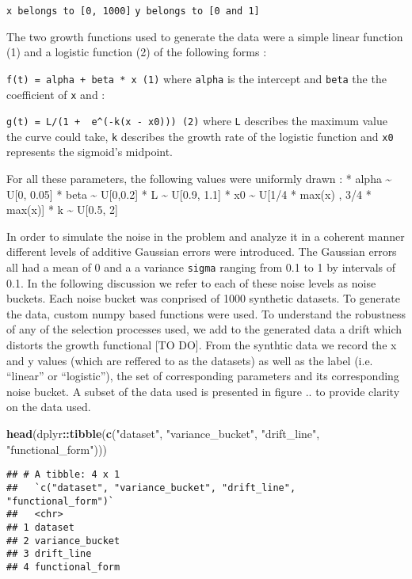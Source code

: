 \documentclass[]{article}
\newenvironment{Shaded}{\begin{snugshade}}{\end{snugshade}}
\newcommand{\KeywordTok}[1]{\textcolor[rgb]{0.13,0.29,0.53}{\textbf{#1}}}
\newcommand{\NormalTok}[1]{#1}
\newcommand{\OperatorTok}[1]{\textcolor[rgb]{0.81,0.36,0.00}{\textbf{#1}}}
\newcommand{\StringTok}[1]{\textcolor[rgb]{0.31,0.60,0.02}{#1}}
\begin{document}
\texttt{x\ belongs\ to\ {[}0,\ 1000{]}}
\texttt{y\ belongs\ to\ {[}0\ and\ 1{]}}

The two growth functions used to generate the data were a simple linear
function (1) and a logistic function (2) of the following forms :

\texttt{f(t)\ =\ alpha\ +\ beta\ *\ x\ (1)} where \texttt{alpha} is the
intercept and \texttt{beta} the the coefficient of \texttt{x} and :

\texttt{g(t)\ =\ L/(1\ +\ \ e\^{}(-k(x\ -\ x0)))\ (2)} where \texttt{L}
describes the maximum value the curve could take, \texttt{k} describes
the growth rate of the logistic function and \texttt{x0} represents the
sigmoid's midpoint.

For all these parameters, the following values were uniformly drawn : *
alpha \textasciitilde{} U{[}0, 0.05{]} * beta \textasciitilde{}
U{[}0,0.2{]} * L \textasciitilde{} U{[}0.9, 1.1{]} * x0
\textasciitilde{} U{[}1/4 * max(x) , 3/4 * max(x){]} * k
\textasciitilde{} U{[}0.5, 2{]}

In order to simulate the noise in the problem and analyze it in a
coherent manner different levels of additive Gaussian errors were
introduced. The Gaussian errors all had a mean of 0 and a a variance
\texttt{sigma} ranging from 0.1 to 1 by intervals of 0.1. In the
following discussion we refer to each of these noise levels as noise
buckets. Each noise bucket was conprised of 1000 synthetic datasets. To
generate the data, custom numpy based functions were used. To understand
the robustness of any of the selection processes used, we add to the
generated data a drift which distorts the growth functional {[}TO DO{]}.
From the synthtic data we record the x and y values (which are reffered
to as the datasets) as well as the label (i.e. ``linear'' or
``logistic''), the set of corresponding parameters and its corresponding
noise bucket. A subset of the data used is presented in figure .. to
provide clarity on the data used.

\begin{Shaded}
\begin{Highlighting}[]
\KeywordTok{head}\NormalTok{(dplyr}\OperatorTok{::}\KeywordTok{tibble}\NormalTok{(}\KeywordTok{c}\NormalTok{(}\StringTok{"dataset"}\NormalTok{, }\StringTok{"variance_bucket"}\NormalTok{, }\StringTok{"drift_line"}\NormalTok{, }\StringTok{"functional_form"}\NormalTok{)))}
\end{Highlighting}
\end{Shaded}

\begin{verbatim}
## # A tibble: 4 x 1
##   `c("dataset", "variance_bucket", "drift_line", "functional_form")`
##   <chr>                                                             
## 1 dataset                                                           
## 2 variance_bucket                                                   
## 3 drift_line                                                        
## 4 functional_form
\end{verbatim}
\end{document}
